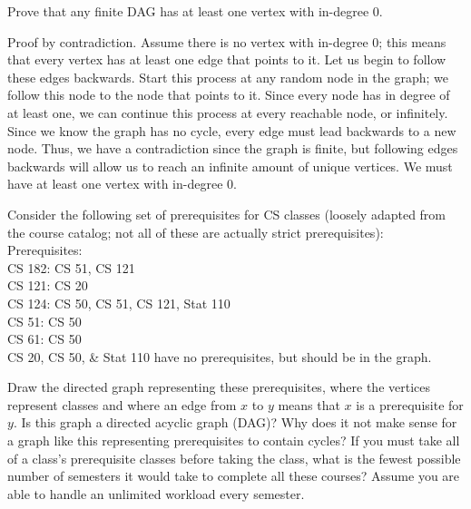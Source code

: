 \documentclass[solution, letterpaper]{cs20inclass}
\begin{document}
\problem
Prove that any finite DAG has at least one vertex with in-degree 0.


\begin{solution}
Proof by contradiction. Assume there is no vertex with in-degree 0; this means that every vertex has at least one edge that points to it. Let us begin to follow these edges backwards. Start this process at any random node in the graph; we follow this node to the node that points to it. Since every node has in degree of at least one, we can continue this process at every reachable node, or infinitely. Since we know the graph has no cycle, every edge must lead backwards to a new node. Thus, we have a contradiction since the graph is finite, but following edges backwards will allow us to reach an infinite amount of unique vertices. We must have at least one vertex with in-degree 0. 


\end{solution}

\problem
Consider the following set of prerequisites for CS classes (loosely adapted from the course catalog; not all of these are actually strict prerequisites): \\
Prerequisites: \\
CS 182: CS 51, CS 121 \\
CS 121: CS 20 \\
CS 124: CS 50, CS 51, CS 121, Stat 110 \\
CS 51: CS 50 \\
CS 61: CS 50 \\
CS 20, CS 50, \& Stat 110 have no prerequisites, but should be in the graph.

\subproblem Draw the directed graph representing these prerequisites, where the vertices represent classes and where an edge from $x$ to $y$ means that $x$ is a prerequisite for $y$.
\subproblem Is this graph a directed acyclic graph (DAG)? Why does it not make sense for a graph like this representing prerequisites to contain cycles?
\subproblem If you must take all of a class's prerequisite classes before taking the class, what is the fewest possible number of semesters it would take to complete all these courses? Assume you are able to handle an unlimited workload every semester.
\end{document}
